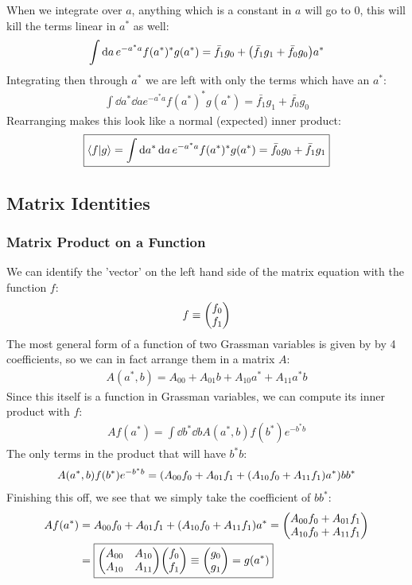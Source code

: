 \documentclass[12pt]{article}
\begin{document}
When we integrate over $a$, anything which is a constant in $a$ will go to $0$, this will kill the terms linear in $a^*$ as well:
\begin{align*}
  \int\dd{a}e^{-a^*a}f(a^*)^*g(a^*)=\bar{f_1}g_0+\qty(\bar{f_1}g_1+\bar{f_0}g_0)a^*
\end{align*}
Integrating then through $a^*$ we are left with only the terms which have an $a^*$:
\begin{align*}
  \int\dd{a^*}\dd{a}e^{-a^*a}f(a^*)^*g(a^*)=\bar{f_1}g_1+\bar{f_0}g_0
\end{align*}
Rearranging makes this look like a normal (expected) inner product:
\begin{align*}
  \boxed{
    \ip{f}{g}=\int\dd{a^*}\dd{a}e^{-a^*a}f(a^*)^*g(a^*)=\bar{f_0}g_0+\bar{f_1}g_1}
\end{align*}
\subsection{Matrix Identities}
\subsubsection{Matrix Product on a Function}
We can identify the 'vector' on the left hand side of the matrix equation with the function $f$:
\begin{align*}
  f\equiv\mqty(f_0\\f_1)
\end{align*}
The most general form of a function of two Grassman variables is given by by 4 coefficients, so we can in fact arrange them in a matrix $A$:
\begin{align*}
  A(a^*,b)=A_{00}+A_{01}b+A_{10}a^*+A_{11}a^*b
\end{align*}
Since this itself is a function in Grassman variables, we can compute its inner product with $f$:
\begin{align*}
  Af(a^*)=\int\dd{b^*}\dd{b} A(a^*,b)f(b^*)e^{-b^*b}
\end{align*}
The only terms in the product that will have $b^*b$:
\begin{align*}
  A(a^*,b)f(b^*)e^{-b^*b}=\qty(A_{00}f_0+A_{01}f_1+\qty(A_{10}f_0+A_{11}f_1)a^*)bb^*
\end{align*}
Finishing this off, we see that we simply take the coefficient of $bb^*$:
\begin{align*}
  Af(a^*)&=A_{00}f_0+A_{01}f_1+\qty(A_{10}f_0+A_{11}f_1)a^*=
  \mqty(A_{00}f_0+A_{01}f_1\\A_{10}f_0+A_{11}f_1)\\
  &=\boxed{
    \mqty(A_{00}&A_{10}\\A_{10}&A_{11})\mqty(f_0\\f_1)\equiv \mqty(g_0\\g_1)=g(a^*)}
\end{align*}
\end{document}

